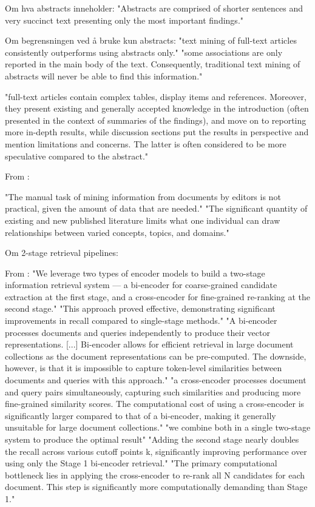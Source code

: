 Om hva abstracts inneholder:
"Abstracts are comprised of shorter sentences and very succinct text presenting only the most important findings."

Om begrensningen ved å bruke kun abstracts:
"text mining of full-text articles consistently outperforms using abstracts only."
"some associations are only reported in the main body of the text. Consequently, traditional text mining of abstracts will never be able to find this information."

"full-text articles contain complex tables, display items and references. Moreover, they present existing and generally accepted knowledge in the introduction (often presented in the context of summaries of the findings), and move on to reporting more in-depth results, while discussion sections put the results in perspective and mention limitations and concerns. The latter is often considered to be more speculative compared to the abstract."

From \parencite{olivetti2020data_driven_materials_research_enabled_natural_language_processing_information_extraction}:

"The manual task of mining information from documents by editors is not practical, given the amount of data that are needed."
"The significant quantity of existing and new published literature limits what one individual can draw relationships between varied concepts, topics, and domains."

Om 2-stage retrieval pipelines:

From \parencite{dorkin2025tartunlp_subject_tagging_two_stage_ir} :
"We leverage two types of encoder models to build a two-stage information retrieval system — a bi-encoder for coarse-grained candidate extraction at the first stage, and a cross-encoder for fine-grained re-ranking at the second stage."
"This approach proved effective, demonstrating significant improvements in recall compared to single-stage methods."
"A bi-encoder processes documents and queries independently to produce their vector representations. [...] Bi-encoder allows for efficient retrieval in large document collections as the document representations can be pre-computed. The downside, however, is that it is impossible to capture token-level similarities between documents and queries with this approach."
"a cross-encoder processes document and query pairs simultaneously, capturing such similarities and producing more fine-grained similarity scores. The computational cost of using a cross-encoder is significantly larger compared to that of a bi-encoder, making it generally unsuitable for large document collections."
"we combine both in a single two-stage system to produce the optimal result"
"Adding the second stage nearly doubles the recall across various cutoff points k, significantly improving performance over using only the Stage 1 bi-encoder retrieval."
"The primary computational bottleneck lies in applying the cross-encoder to re-rank all N candidates for each document. This step is significantly more computationally demanding than Stage 1."

